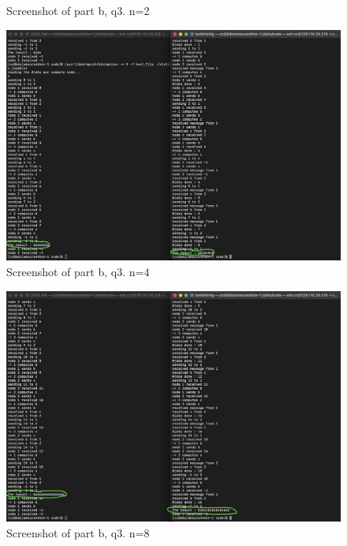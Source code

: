 \documentclass{article}
\begin{document}
\begin{enumerate}
\begin{enumerate}
\begin{enumerate}
\begin{figure}[H]
        \caption{Screenshot of part b, q3. n=2}
      \end{figure}
      \begin{figure}[H]
        \centering
        \includegraphics[width=\textwidth]{image9.png}
        \caption{Screenshot of part b, q3. n=4}
      \end{figure}
      \begin{figure}[H]
        \centering
        \includegraphics[width=\textwidth]{image10.png}
        \caption{Screenshot of part b, q3. n=8}
      \end{figure}
      \begin{figure}[H]
        \centering

\end{figure}
\end{enumerate}
\end{enumerate}
\end{enumerate}
\end{document}
